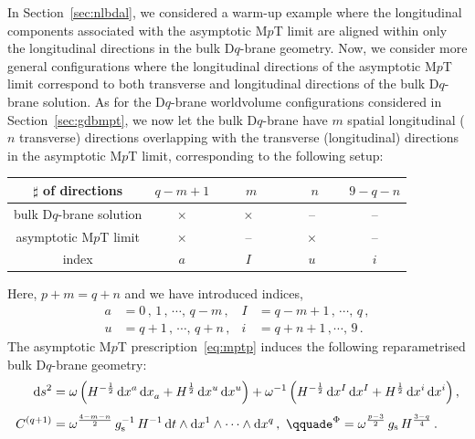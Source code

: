 \documentclass[11pt]{article}
\newcommand{\dd}{\mathrm{d}}
\begin{document}
In Section~\ref{sec:nlbdal}, we considered a warm-up example where the longitudinal components associated with the asymptotic M$p$T limit are aligned within only the longitudinal directions in the bulk D$q$-brane geometry. Now, we consider more general configurations where the longitudinal directions of the asymptotic M$p$T limit correspond to both transverse and longitudinal directions of the bulk D$q$-brane solution.  
As for the D$q$-brane worldvolume configurations considered in Section~\ref{sec:gdbmpt}, we now let the bulk D$q$-brane have $m$ spatial longitudinal ($n$ transverse) directions overlapping with the transverse (longitudinal) directions in the asymptotic M$p$T limit, corresponding to the following setup:
\begin{center}
\begin{tabular}{c|c|c|c|c}
$\sharp$ of directions & $q-m+1$ & \,$\phantom{q-}m\phantom{-q}$\, & \,$\phantom{q-}n\phantom{-q}$\, & $9 - q - n$ \\[2pt]
\hline 
bulk D$q$-brane solution & $\times$ & $\times$ & -- & -- \\[2pt]
asymptotic M$p$T limit & $\times$ & -- & $\times$ & -- \\[2pt]
\hline
index & $a$ & $I$ & $u$ & $i$
\end{tabular}
\end{center}
%
Here, $p + m = q + n$ and we have introduced indices,
%
\begin{subequations} \label{eq:indices}
\begin{align}
    a & = 0\,, \, 1\,, \, \cdots, \, q - m\,, 
        &%
    I & = q - m + 1\,, \, \cdots, \, q\,, \\[4pt]
    u & = q+1\,, \, \cdots, \, q + n\,, 
        &%
    i & = q + n + 1\,, \cdots, \, 9\,.
\end{align}
\end{subequations}
The asymptotic M$p$T prescription~\eqref{eq:mptp} induces the following reparametrised bulk D$q$-brane geometry:
%
\begin{subequations} \label{DqSoln_forlimit_mixed}
\begin{align} 
    \dd s^2 & = \omega \, \Bigl( H^{-\frac{1}{2}} \, \dd x^a \, \dd x^{}_a + H^{\frac{1}{2}} \, \dd x^u \, \dd x^u \Bigr)  
    + \omega^{-1} \, \Bigl( H^{-\frac{1}{2}} \, \dd x^I \, \dd x^I + H^{\frac{1}{2}} \, \dd x^i \, \dd x^i \Bigr)\,, \\[4pt]
    C^{(q+1)} & = \omega^{\frac{4 - m - n}{2}} \, g_\text{s}^{-1} \, H^{-1} \, \dd t \wedge \dd x^1 \wedge \dots \wedge \dd x^q \,,\
        \qquad%
    e^\Phi = \omega^{\frac{p-3}{2}} \, g_\text{s} \, H^{\frac{3-q}{4}}\,.
\end{align}
\end{subequations}
\end{document}
